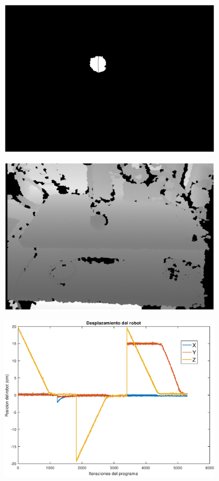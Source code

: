 \begin{figure}
	\centering
	\includegraphics[width=1\linewidth]{visio/graficasderesultados/erz1}
	\caption{}
	\label{fig:erz1}
\end{figure}
\begin{figure}
	\centering
	\includegraphics[width=1\linewidth]{visio/graficasderesultados/imagen1}
	\caption{}
	\label{fig:imagen1}
\end{figure}
\begin{figure}
	\centering
	\includegraphics[width=1\linewidth]{visio/graficasderesultados/posicion1}
	\caption{}
	\label{fig:posicion1}
\end{figure}
